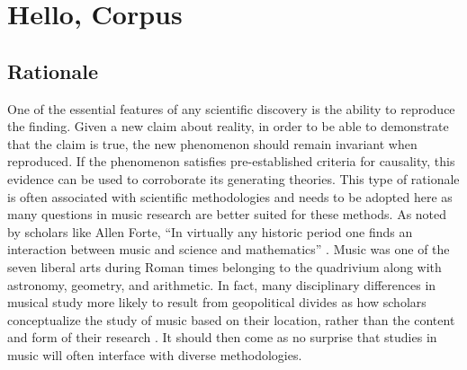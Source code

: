 \documentclass[]{book}
\begin{document}
\hypertarget{chapterfour}{%
\chapter{Hello, Corpus}\label{chapterfour}}

\hypertarget{rationale-3}{%
\section{Rationale}\label{rationale-3}}

One of the essential features of any scientific discovery is the ability to reproduce the finding.
Given a new claim about reality, in order to be able to demonstrate that the claim is true, the new phenomenon should remain invariant when reproduced.
If the phenomenon satisfies pre-established criteria for causality, this evidence can be used to corroborate its generating theories.
This type of rationale is often associated with scientific methodologies and needs to be adopted here as many questions in music research are better suited for these methods.
As noted by scholars like Allen Forte, ``In virtually any historic period one finds an interaction between music and science and mathematics'' \citep{forteMusicComputingPresent1967}.
Music was one of the seven liberal arts during Roman times belonging to the quadrivium along with astronomy, geometry, and arithmetic.
In fact, many disciplinary differences in musical study more likely to result from geopolitical divides as how scholars conceptualize the study of music based on their location, rather than the content and form of their research \citep{parncuttSystematicMusicologyHistory2007}.
It should then come as no surprise that studies in music will often interface with diverse methodologies.
\end{document}
